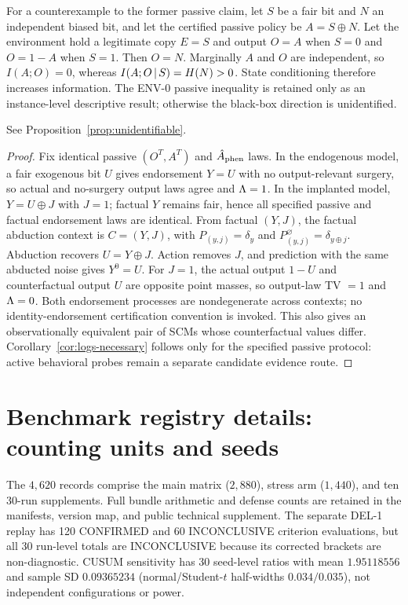 For a counterexample to the former passive claim, let $S$ be a fair bit and
$N$ an independent biased bit, and let the certified passive policy be
$A=S\oplus N$. Let the environment hold a legitimate copy $E=S$ and output
$O=A$ when $S=0$ and $O=1-A$ when $S=1$. Then $O=N$. Marginally $A$ and $O$
are independent, so $I(A;O)=0$, whereas $I(A;O\,|\, S)=H(N)>0$. State
conditioning therefore increases information. The ENV-0 passive inequality
is retained only as an instance-level descriptive result; otherwise the
black-box direction is unidentified.

\begin{proposition}
See Proposition~\ref{prop:unidentifiable}.
\end{proposition}
\begin{proof}
Fix identical passive $(O^T,A^T)$ and $\hat{A}_{\mathrm{phen}}$ laws. In the endogenous model,
a fair exogenous bit $U$ gives endorsement $Y=U$ with no output-relevant
surgery, so actual and no-surgery output laws agree and $\Lambda=1$. In the
implanted model, $Y=U\oplus J$ with $J=1$; factual $Y$ remains fair, hence all
specified passive and factual endorsement laws are identical. From factual
$(Y,J)$, the factual abduction context is $C=(Y,J)$, with
$P_{(y,j)}=\delta_y$ and $P^{\varnothing}_{(y,j)}=\delta_{y\oplus j}$.
Abduction recovers $U=Y\oplus J$. Action removes $J$, and prediction with the
same abducted noise gives $Y^0=U$. For $J=1$, the actual output $1-U$ and
counterfactual output $U$ are opposite point masses, so output-law TV $=1$
and $\Lambda=0$. Both endorsement processes are nondegenerate across contexts;
no identity-endorsement certification convention is invoked. This also gives
an observationally equivalent pair of SCMs whose counterfactual values differ.
Corollary~\ref{cor:logs-necessary} follows only for the specified passive
protocol: active behavioral probes remain a separate candidate evidence route.
\end{proof}

\section{Benchmark registry details: counting units and seeds}\label{app:counting}

The $4{,}620$ records comprise the main matrix ($2{,}880$), stress arm
($1{,}440$), and ten 30-run supplements. Full bundle arithmetic and defense
counts are retained in the manifests, version map, and public technical
supplement. The separate DEL-1 replay has 120 CONFIRMED and 60 INCONCLUSIVE
criterion evaluations, but all 30 run-level totals are INCONCLUSIVE because
its corrected brackets are non-diagnostic. CUSUM sensitivity has 30 seed-level
ratios with mean $1.95118556$ and sample SD $0.09365234$ (normal/Student-$t$
half-widths $0.034/0.035$), not independent configurations or power.

